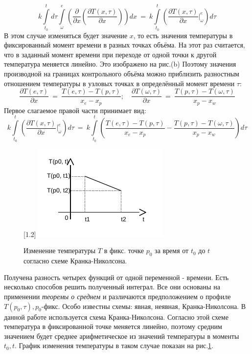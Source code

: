 \documentclass[oneside, final, 14pt]{report}
\begin{document}
\[
k\int\limits_{t_0}^t d\tau \int\limits_{\omega}^e \left(\frac{\partial}{\partial x}(\frac{\partial T(x,\tau)}{\partial x}) \right)dx 
\ = \
k\int\limits_{t_0}^t \left( \frac{\partial T(x,\tau)}{\partial x}\bigg|_{\omega}^e\right) d\tau 
\]
В этом случае изменяться будет значение $x$, то есть значения температуры в фиксированный момент времени в разных точках объёма. На этот раз считается, что в заданный момент времени при переходе от одной точки к другой температура меняется линейно. Это изображено на рис.(b)
Поэтому значения производной на границах контрольного объёма можно приблизить разностным отношением температуры в узловых точках в определённый момент времени $\tau$:
\[
\frac{\partial T(e,\tau)}{\partial x} 
\ = \ 
\frac{T(e,\tau) - T(p,\tau)}{x_e - x_p}; \quad \frac{\partial T(\omega,\tau)}{\partial x}
\ = \ 
\frac{T(p,\tau) - T(\omega,\tau)}{x_p - x_{w}}
\]
Первое слагаемое правой части принимает вид:
\[
k\int\limits_{t_0}^t \left( \frac{\partial T(x,\tau)}{\partial x}\bigg|_{\omega}^e\right) d\tau 
 \ = \  
k\int\limits_{t_0}^t \left( \frac{T(e,\tau) - T(p,\tau)}{x_e - x_p} - \frac{T(p,\tau) - T(\omega,\tau)}{x_p - x_{w}} \right) d\tau
\]
\begin{figure}[b!]
 \centering
 \scalebox{2.0}[1.2]{\includegraphics{../img_pdf_cropped/Krank_Nikolson}}
 \caption{Изменение температуры $T$ в фикс. точке $p_0$ за время от $t_0$ до $t$ согласно схеме Кранка-Николсона.}
 \label{img_scemes}
\end{figure}
Получена разность четырех функций от одной переменной - времени. Есть несколько способов решить полученный интеграл. Все они основаны на применении \emph{теоремы о среднем} и различаются предположением о профиле $T(p_0, \tau), p_0$-фикс. Особо известны схемы: явная, неявная, Кранка-Николсона. В данной работе используется схема Кранка-Николсона. Согласно этой схеме температура в фиксированной точке меняется линейно, поэтому средним значением будет среднее арифметическое из значений температуры в моменты $t_0, t$. График изменения температуры в таком случае показан на рис.\ref{img_scemes}. 
\end{document}
